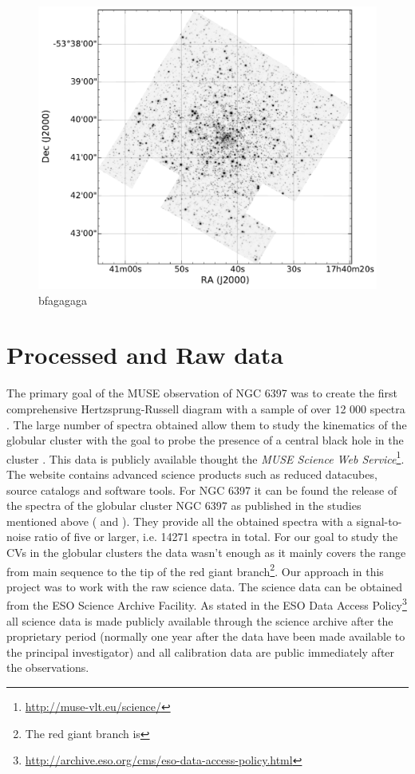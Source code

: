 \begin{figure}[H]
        \centering
        \includegraphics[scale=.6]{assets/images/mosaic.pdf}
\caption{bfagagaga}
\label{fig:clustermuse}
\end{figure}

\section{Processed and Raw data} 

The primary goal of the MUSE observation of NGC 6397 was to create the first comprehensive Hertzsprung-Russell diagram with a sample of over 12 000 spectra \citep{husser_muse_2016}. The large number of spectra obtained allow them to study the kinematics of the globular cluster with the goal to probe the presence of a central black hole in the cluster \citep{kamann_muse_2016}. This data is publicly available thought the \emph{MUSE Science Web Service}\footnote{\url{http://muse-vlt.eu/science/}}. The website contains advanced science products such as reduced datacubes, source catalogs and software tools. For NGC 6397 it can be found the release of the spectra of the globular cluster NGC 6397 as published in the studies mentioned above (\cite{husser_muse_2016} and \cite{kamann_muse_2016}). They provide all the obtained spectra with a signal-to-noise ratio of five or larger, i.e. 14271 spectra in total. For our goal to study the CVs in the globular clusters the data wasn't enough as it mainly covers the range from main sequence to the tip of the red giant branch\footnote{The red giant branch is }. Our approach in this project was to work with the raw science data. The science data can be obtained from the ESO  Science Archive Facility. As stated in the ESO Data Access Policy\footnote{\url{http://archive.eso.org/cms/eso-data-access-policy.html}} all science data is made publicly available through the science archive after the proprietary period (normally one year after the data have been made available to the principal investigator) and all calibration data are public immediately after the observations.  

